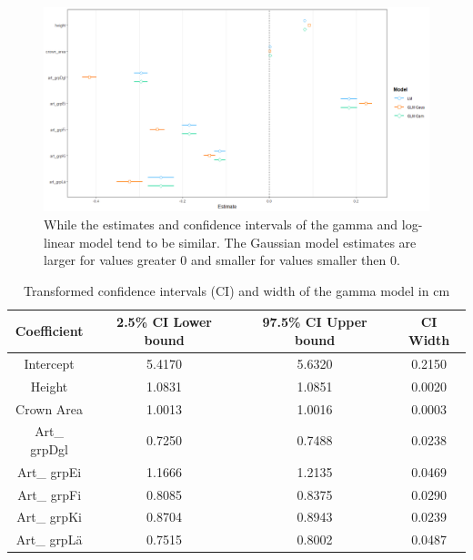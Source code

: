 \begin{figure}[H]
  \includegraphics[width=\textwidth]{coefficients.png}
  \caption{While the estimates and confidence intervals of the gamma and log-linear model tend to be similar. The Gaussian model estimates are larger for values greater 0 and smaller for values smaller then 0.}
  \label{fig:Coefficients}
\end{figure}


\begin{table}[H]
\setlength\arrayrulewidth{1pt}
\centering
\begin{adjustbox}{max width=\textwidth}
\begin{tabular}{|c| c| c| c|}
\hline 
\rowcolor{Gray}
\textbf{Coefficient} & \textbf{2.5\% CI Lower bound} & \textbf{97.5\% CI Upper bound} & \textbf{CI Width} \\
\hline
Intercept & 5.4170 & 5.6320 & 0.2150 \\ 
\hline 
Height & 1.0831 & 1.0851 & 0.0020 \\ 
\hline 
Crown Area & 1.0013 & 1.0016 & 0.0003 \\ 
\hline 
Art\_ grpDgl & 0.7250 & 0.7488 & 0.0238 \\ 
\hline 
Art\_ grpEi & 1.1666 & 1.2135 & 0.0469 \\ 
\hline 
Art\_ grpFi & 0.8085 & 0.8375 & 0.0290 \\ 
\hline 
Art\_ grpKi & 0.8704 & 0.8943 & 0.0239 \\ 
\hline 
Art\_ grpLä & 0.7515 & 0.8002 & 0.0487 \\ 
\hline 
\end{tabular} 
\end{adjustbox}

\caption{Transformed confidence intervals (CI) and width of the gamma model in cm}
\label{tab:CI}


\end{table}

